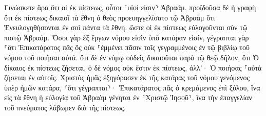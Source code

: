 \documentclass{openreader}
\begin{document}
Γινώσκετε ἄρα ὅτι οἱ ἐκ πίστεως, οὗτοι ⸂υἱοί εἰσιν⸃ Ἀβραάμ. 
προϊδοῦσα δὲ ἡ γραφὴ ὅτι ἐκ πίστεως δικαιοῖ τὰ ἔθνη ὁ θεὸς προευηγγελίσατο τῷ Ἀβραὰμ ὅτι Ἐνευλογηθήσονται ἐν σοὶ πάντα τὰ ἔθνη. 
ὥστε οἱ ἐκ πίστεως εὐλογοῦνται σὺν τῷ πιστῷ Ἀβραάμ. 
Ὅσοι γὰρ ἐξ ἔργων νόμου εἰσὶν ὑπὸ κατάραν εἰσίν, γέγραπται γὰρ ⸀ὅτι Ἐπικατάρατος πᾶς ὃς οὐκ ⸀ἐμμένει πᾶσιν τοῖς γεγραμμένοις ἐν τῷ βιβλίῳ τοῦ νόμου τοῦ ποιῆσαι αὐτά. 
ὅτι δὲ ἐν νόμῳ οὐδεὶς δικαιοῦται παρὰ τῷ θεῷ δῆλον, ὅτι Ὁ δίκαιος ἐκ πίστεως ζήσεται, 
ὁ δὲ νόμος οὐκ ἔστιν ἐκ πίστεως, ἀλλ’· Ὁ ποιήσας ⸀αὐτὰ ζήσεται ἐν αὐτοῖς. 
Χριστὸς ἡμᾶς ἐξηγόρασεν ἐκ τῆς κατάρας τοῦ νόμου γενόμενος ὑπὲρ ἡμῶν κατάρα, ⸂ὅτι γέγραπται⸃· Ἐπικατάρατος πᾶς ὁ κρεμάμενος ἐπὶ ξύλου, 
ἵνα εἰς τὰ ἔθνη ἡ εὐλογία τοῦ Ἀβραὰμ γένηται ἐν ⸂Χριστῷ Ἰησοῦ⸃, ἵνα τὴν ἐπαγγελίαν τοῦ πνεύματος λάβωμεν διὰ τῆς πίστεως. 
\end{document}
